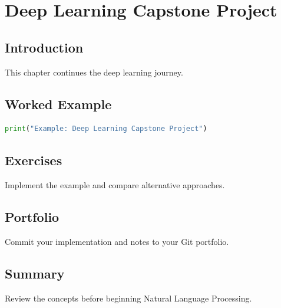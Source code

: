 \chapter{Deep Learning Capstone Project}
\label{chap:vol7-15}



\section{Introduction}
This chapter continues the deep learning journey.

\section{Worked Example}
\begin{lstlisting}[language=Python]
print("Example: Deep Learning Capstone Project")
\end{lstlisting}

\section{Exercises}
\begin{exercise}
Implement the example and compare alternative approaches.
\end{exercise}

\section{Portfolio}
Commit your implementation and notes to your Git portfolio.

\section{Summary}
Review the concepts before beginning Natural Language Processing.
